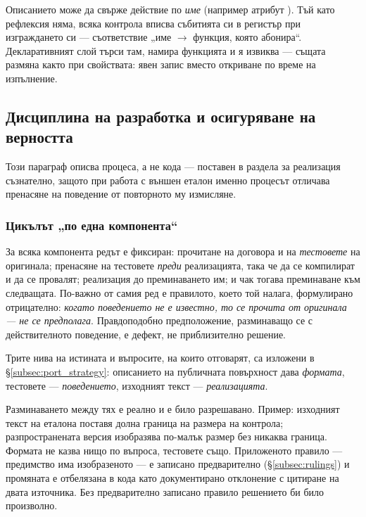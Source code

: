 Описанието може да свърже действие по \emph{име} (например атрибут ). Тъй като
рефлексия няма, всяка контрола вписва събитията си в регистър при изграждането си ---
съответствие „име $\rightarrow$ функция, която абонира“. Декларативният слой търси там,
намира функцията и я извиква --- същата размяна както при свойствата: явен запис вместо
откриване по време на изпълнение.

\subsection{Дисциплина на разработка и осигуряване на верността}
\label{subsec:process}

Този параграф описва процеса, а не кода --- поставен в раздела за реализация съзнателно,
защото при работа с външен еталон именно процесът отличава пренасяне на поведение от
повторното му измисляне.

\subsubsection{Цикълът „по една компонента“}

За всяка компонента редът е фиксиран: прочитане на договора и на \emph{тестовете} на
оригинала; пренасяне на тестовете \emph{преди} реализацията, така че да се компилират и да
се провалят; реализация до преминаването им; и чак тогава преминаване към следващата.
По-важно от самия ред е правилото, което той налага, формулирано отрицателно: \emph{когато
поведението не е известно, то се прочита от оригинала --- не се предполага}. Правдоподобно
предположение, разминаващо се с действителното поведение, е дефект, не приблизително
решение.

Трите нива на истината и въпросите, на които отговарят, са изложени в
§\ref{subsec:port_strategy}: описанието на публичната повърхност дава \emph{формата},
тестовете --- \emph{поведението}, изходният текст --- \emph{реализацията}.

Разминаването между тях е реално и е било разрешавано. Пример: изходният текст на еталона
поставя долна граница на размера на контрола; разпространената версия изобразява по-малък
размер без никаква граница. Формата не казва нищо по въпроса, тестовете също. Приложеното
правило --- предимство има изобразеното --- е записано предварително (§\ref{subsec:rulings})
и промяната е отбелязана в кода като документирано отклонение с цитиране на двата източника.
Без предварително записано правило решението би било произволно.

